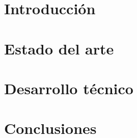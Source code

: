\chapter[Introducción]{Introducción}


\chapter[Estado del arte]{Estado del arte}

\chapter[Desarrollo técnico]{Desarrollo técnico}

\chapter[Conclusiones]{Conclusiones}

% 